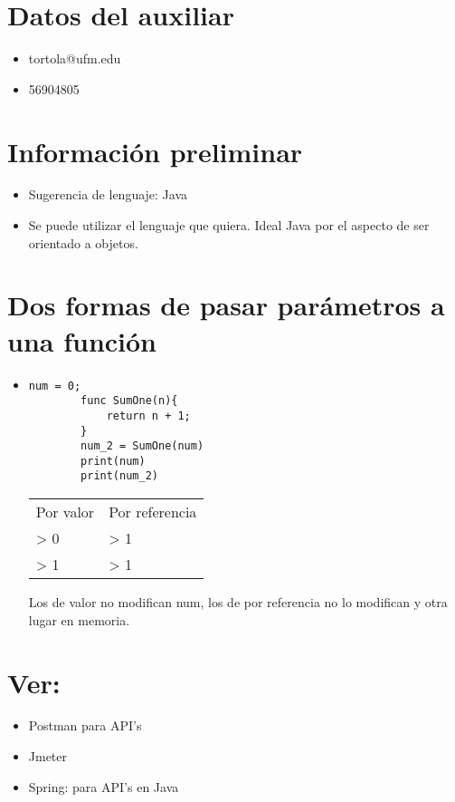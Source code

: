\section{Datos del auxiliar}
\begin{itemize}
    \item tortola@ufm.edu 
    \item 56904805 
\end{itemize}


\section{Información preliminar}
\begin{itemize}
    \item Sugerencia de lenguaje: Java 
    \item Se puede utilizar el lenguaje que quiera. Ideal Java por el aspecto de ser orientado a objetos.
\end{itemize}


\section{Dos formas de pasar parámetros a una función}
\begin{itemize}
    \item \begin{Verbatim}[breaklines=true, breakanywhere=true]
        num = 0;
        func SumOne(n){
            return n + 1; 
        }
        num_2 = SumOne(num) 
        print(num)
        print(num_2)
    \end{Verbatim}
    \begin{center}
       \begin{tabular}{ | p{5cm} | p{5cm} |}
           \hline
         Por valor & Por referencia \\
         > 0 & > 1 \\ 
         > 1 & > 1 \\ 
           \hline
       \end{tabular}
    \end{center}
    Los de valor no modifican num, los de por referencia no lo modifican y otra lugar en memoria.  
\end{itemize}

\section{Ver:}
\begin{itemize}
    \item Postman para API's
    \item Jmeter
    \item Spring: para API's en Java 
\end{itemize}
